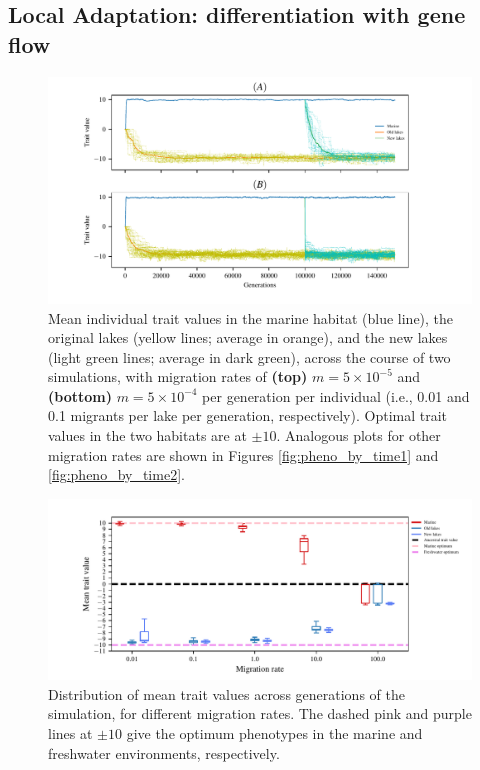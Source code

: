 \documentclass{article}
\begin{document}
\subsection*{Local Adaptation: differentiation with gene flow}

\begin{figure}
	\begin{center}
        \includegraphics{Final_Plots/Pheno_Time.pdf}
  		\caption{ 
        		Mean individual trait values in the marine habitat (blue line),
        		the original lakes (yellow lines; average in orange),
        		and the new lakes (light green lines; average in dark green),
        		across the course of two simulations, with migration rates of
        		\textbf{(top)} $m=5 \times 10^{-5}$ and
        		\textbf{(bottom)} $m=5 \times 10^{-4}$ per generation per individual
        		(i.e., 0.01 and 0.1 migrants per lake per generation, respectively).
        		Optimal trait values in the two habitats are at $\pm 10$.
                Analogous plots for other migration rates
                are shown in Figures \ref{fig:pheno_by_time1} and \ref{fig:pheno_by_time2}.
		}
  		\label{fig:phenotype_ts2}
	\end{center}
\end{figure}

\begin{figure}
	\begin{center}
  		\includegraphics{Final_Plots/Pheno_Dist.pdf}
  		\caption{
            Distribution of mean trait values across generations of the simulation,
            for different migration rates.
            The dashed pink and purple lines at $\pm 10$ give the optimum phenotypes
            in the marine and freshwater environments, respectively.
		}
  		\label{fig:MeanPhenotype}
	\end{center}
\end{figure}
\end{document}
